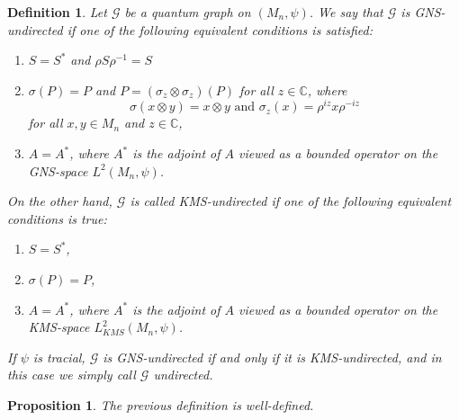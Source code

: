 \documentclass{amsart}
\newtheorem{definition}[thm]{Definition}
\newtheorem{proposition}[thm]{Proposition}
\newcommand{\C}{\mathbb{C}}
\begin{document}
\begin{definition}
\label{pre::def:GNS-KMS-undirected_quantum_graphs}
    Let $\mathcal{G}$ be a quantum graph on $(M_n, \psi)$. We say that $\mathcal{G}$ is \emph{GNS-undirected} if one of the following equivalent conditions is satisfied:
    \begin{enumerate}
        \item $S=S^*$ and $\rho S \rho^{-1} = S$
        \item $\sigma(P)=P$ and $P = (\sigma_z \otimes \sigma_z)(P)$ for all $z \in \C$, where 
        $$
        \sigma(x \otimes y) = x \otimes y
        \text{ and }
        \sigma_z(x) = \rho^{iz} x \rho^{-iz}
        $$
        for all $x, y \in M_n$ and $z \in \C$,
        \item $A=A^*$, where $A^*$ is the adjoint of $A$ viewed as a bounded operator on the GNS-space $L^2(M_n, \psi)$.
    \end{enumerate}
    On the other hand, $\mathcal{G}$ is called \emph{KMS-undirected} if one of the following equivalent conditions is true:
    \begin{enumerate}
        \item $S = S^*$,
        \item $\sigma(P) = P$,
        \item $A = A^*$, where $A^*$ is the adjoint of $A$ viewed as a bounded operator on the KMS-space $L^2_{KMS}(M_n, \psi)$.
    \end{enumerate}
    If $\psi$ is tracial, $\mathcal{G}$ is GNS-undirected if and only if it is KMS-undirected, and in this case we simply call $\mathcal{G}$ undirected.
\end{definition}


\begin{proposition}
    The previous definition is well-defined.
\end{proposition}
\end{document}
